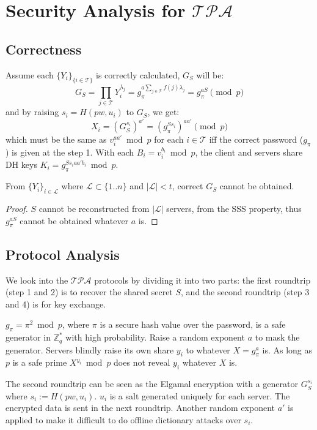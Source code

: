 \section{Security Analysis for $\mathcal{TPA}$}
\label{tpa}
\subsection{Correctness}
Assume each $\{Y_i\}_{\{i \in \mathcal{T}\}}$ is correctly calculated,
$G_S$ will be:
\[
  G_S = \prod_{j \in \mathcal{T}}Y_i^{\lambda_j} = g_{\pi}^{a \sum_{j
      \in \mathcal{T}} f(j) \lambda_j} = g_{\pi}^{aS} \pmod p
\]
and by raising $s_i = H(pw, u_i)$ to $G_S$, we get:
\[
  X_i = (G_S^{s_i})^{a'} = (g_{\pi}^{Ss_i})^{aa'} \pmod p
\]
which must be the same as $v_i^{aa'} \bmod p$ for each $i \in
\mathcal{T}$ iff the correct password ($g_{\pi}$) is given at the
step 1. With each $B_i = v_i^{b_i} \bmod p$, the client and servers
share DH keys $K_i = g_{\pi}^{Ss_iaa'b_i} \bmod p$.

\begin{lemma}
\label{tpa1}
From $\{Y_i\}_{i \in \mathcal{L}}$ where $\mathcal{L} \subset \{1..n\}$ and $|\mathcal{L}| <
t$, correct $G_S$ cannot be obtained.
\end{lemma}

\begin{proof}
$S$ cannot be reconstructed from $|\mathcal{L}|$ servers, from the SSS
  property, thus $g_{\pi}^{aS}$ cannot be obtained whatever $a$ is.
\end{proof}

\subsection{Protocol Analysis}
We look into the $\mathcal{TPA}$ protocols by dividing it into two
parts: the first roundtrip (step 1 and 2) is to recover the shared
secret $S$, and the second roundtrip (step 3 and 4) is for key
exchange.

$g_{\pi} = \pi^2 \bmod p$, where $\pi$ is a secure hash value over the
password, is a safe generator in $\mathbb{Z}^*_q$ with high
probability. Raise a random exponent $a$ to mask the
generator. Servers blindly raise its own share $y_i$ to whatever $X =
g_{\pi}^a$ is. As long as $p$ is a safe prime $X^{y_i} \bmod p$ does
not reveal $y_i$ whatever $X$ is.

The second roundtrip can be seen as the Elgamal encryption with a
generator $G_S^{s_i}$ where $s_i := H(pw, u_i)$. $u_i$ is a salt
generated uniquely for each server. The encrypted data is sent in the
next roundtrip.  Another random exponent $a'$ is applied to make it
difficult to do offline dictionary attacks over $s_i$.

